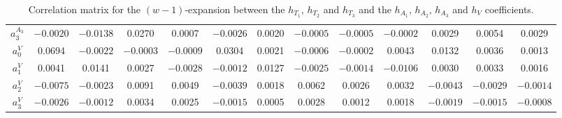 \documentclass[aps,superscriptaddress,showpacs,nofootinbib,11pt]{revtex4-1}
\begin{document}
\begin{table}[h]
\begin{ruledtabular}
\begin{center}
{\begin{tabular}{ccccccccccccc}
$a_3^{{A_3}}$& $-0.0020$&  $-0.0138$&   \hspace{.25cm}0.0270&   \hspace{.25cm}0.0007 & $-0.0026$&   \hspace{.25cm}0.0020&  $-0.0005$ & $-0.0005$ & $-0.0002$&   \hspace{.25cm}0.0029&   \hspace{.25cm}0.0054&	\hspace{.25cm}0.0029\\
$a_0^{{V}}$&  \hspace{.25cm}0.0694 & $-0.0022$&  $-0.0003$&  $-0.0009$ &  \hspace{.25cm}0.0304&   \hspace{.25cm}0.0021&  $-0.0006$ & $-0.0002$ &  \hspace{.25cm}0.0043&   \hspace{.25cm}0.0132&   \hspace{.25cm}0.0036&	\hspace{.25cm}0.0013\\
$a_1^{{V}}$&  \hspace{.25cm}0.0041&   \hspace{.25cm}0.0141&   \hspace{.25cm}0.0027& $ -0.0028$ & $-0.0012$&   \hspace{.25cm}0.0127&  $-0.0025$ & $-0.0014$ & $-0.0106$&   \hspace{.25cm}0.0030&   \hspace{.25cm}0.0033&	\hspace{.25cm}0.0016\\
$a_2^{{V}}$& $-0.0075$&  $-0.0023$ &  \hspace{.25cm}0.0091&   \hspace{.25cm}0.0049 & $-0.0039$&   \hspace{.25cm}0.0018&   \hspace{.25cm}0.0062 &  \hspace{.25cm}0.0026 &  \hspace{.25cm}0.0032&  $-0.0043$&  $-0.0029$&  $-0.0014$\\
$a_3^{{V}}$& $-0.0026$ & $-0.0012$ &  \hspace{.25cm}0.0034&   \hspace{.25cm}0.0025 & $-0.0015$&   \hspace{.25cm}0.0005&   \hspace{.25cm}0.0028 &  \hspace{.25cm}0.0012 &  \hspace{.25cm}0.0018&  $-0.0019$&  $-0.0015$&  $-0.0008$\\

\end{tabular}}
    \caption{Correlation matrix for the $(w-1)$-expansion between  the $h_{T_1},\,h_{T_2}$ and $h_{T_3}$ and the $h_{A_1},\,h_{A_2},\,h_{A_3}$ and $h_V$ coefficients. }
   \label{tab:ht123ha123v}
   \end{center}
   \end{ruledtabular}
\end{table}
%
%




\end{document}
